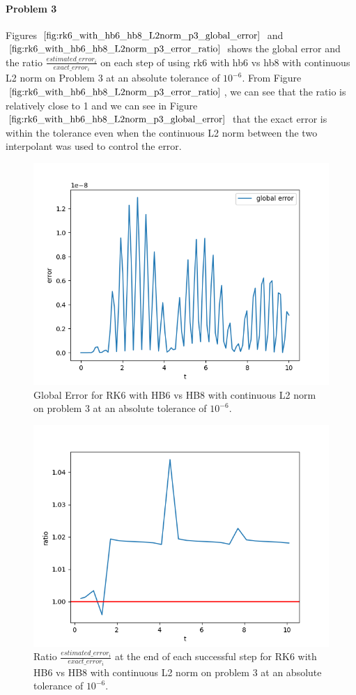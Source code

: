 \paragraph{Problem 3} Figures $\ref{fig:rk6_with_hb6_hb8_L2norm_p3_global_error}$ and $\ref{fig:rk6_with_hb6_hb8_L2norm_p3_error_ratio}$ shows the global error and the ratio $\frac{estimated\_error_i}{exact\_error_i}$ on each step of using rk6 with hb6 vs hb8 with continuous L2 norm on Problem 3 at an absolute tolerance of $10^{-6}$. From Figure $\ref{fig:rk6_with_hb6_hb8_L2norm_p3_error_ratio}$, we can see that the ratio is relatively close to 1 and we can see in Figure $\ref{fig:rk6_with_hb6_hb8_L2norm_p3_global_error}$ that the exact error is within the tolerance even when the continuous L2 norm between the two interpolant was used to control the error.


\begin{figure}[H]
\centering
\includegraphics[width=0.7\linewidth]{./figures/rk6_with_hb6_hb8_L2norm_p3_global_error}
\caption{Global Error for RK6 with HB6 vs HB8 with continuous L2 norm on problem 3 at an absolute tolerance of $10^{-6}$.}
\label{fig:rk6_with_hb6_hb8_L2norm_p3_global_error}
\end{figure}

\begin{figure}[H]
\centering
\includegraphics[width=0.7\linewidth]{./figures/rk6_with_hb6_hb8_L2norm_p3_error_ratio}
\caption{Ratio $\frac{estimated\_error_i}{exact\_error_i}$ at the end of each successful step for RK6 with HB6 vs HB8 with continuous L2 norm on problem 3 at an absolute tolerance of $10^{-6}$.}
\label{fig:rk6_with_hb6_hb8_L2norm_p3_error_ratio}
\end{figure}

